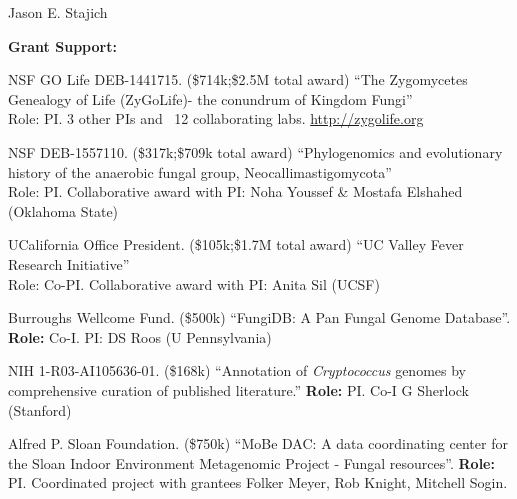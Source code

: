 \documentclass[10pt]{article}
\begin{document}
\begin{cv}{\centerline{Jason E. Stajich}}
\begin{cvlistcompact}{\bf Grant Support:}
\item [2015-2018] NSF GO Life DEB-1441715. (\$714k;\$2.5M total award) ``The Zygomycetes Genealogy of Life (ZyGoLife)- the conundrum of Kingdom Fungi'' \\
  Role: PI. 3 other PIs and ~12 collaborating labs. \url{http://zygolife.org} 

\item [2016-2019] NSF DEB-1557110. (\$317k;\$709k total award) ``Phylogenomics and evolutionary history of the anaerobic fungal group, Neocallimastigomycota'' \\
Role: PI. Collaborative award with PI: Noha Youssef \& Mostafa Elshahed (Oklahoma State)

\item [2017-2020] UCalifornia Office President. (\$105k;\$1.7M total award) ``UC Valley Fever Research Initiative'' \\
Role: Co-PI. Collaborative award with PI: Anita Sil (UCSF)

\item [{\bf Completed support}]

\item [2010-2013] Burroughs Wellcome Fund. (\$500k) ``FungiDB: A Pan Fungal Genome Database''. \textbf{Role:} Co-I. PI: DS Roos (U Pennsylvania)

\item [2013-2014] NIH 1-R03-AI105636-01. (\$168k) ``Annotation of
  \textit{Cryptococcus} genomes by comprehensive curation of published
  literature.'' \textbf{Role:} PI. Co-I G Sherlock (Stanford)

  \item [2011-2014] Alfred P. Sloan Foundation. (\$750k) ``MoBe DAC: A
    data coordinating center for the Sloan Indoor Environment
    Metagenomic Project - Fungal resources''. \textbf{Role:} PI.
    Coordinated project with grantees Folker Meyer, Rob Knight, Mitchell Sogin.

\setlength{\cvlabelwidth}{18mm}
  

\end{cvlistcompact}
\end{cv}
\end{document}
